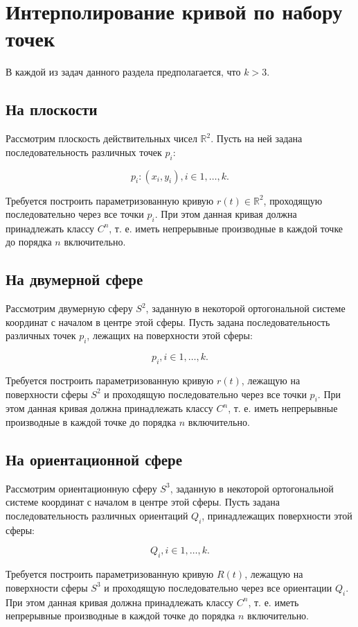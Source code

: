 \section{Интерполирование кривой по набору точек}

В каждой из задач данного раздела предполагается, что $k>3$.

\subsection*{На плоскости}

Рассмотрим плоскость действительных чисел $\mathbb{R}^2$. Пусть на ней задана последовательность различных точек $p_i$:

$${p_i: (x_i, y_i)}, i \in {1, \dots, k}.$$

Требуется построить параметризованную кривую $r(t) \in \mathbb{R}^2$, проходящую последовательно через все точки
$p_i$. При этом данная кривая должна принадлежать классу $C^n$, т. е. иметь непрерывные производные в каждой точке до
порядка $n$ включительно.

\subsection*{На двумерной сфере}

Рассмотрим двумерную сферу $S^2$, заданную в некоторой ортогональной системе координат с началом в центре этой сферы.
Пусть задана последовательность различных точек $p_i$, лежащих на поверхности этой сферы:

$${p_i}, i \in {1, \dots, k}.$$

Требуется построить параметризованную кривую $r(t)$, лежащую на поверхности сферы $S^2$ и проходящую последовательно
через все точки $p_i$. При этом данная кривая должна принадлежать классу $C^n$, т. е. иметь непрерывные производные в
каждой точке до порядка $n$ включительно.

\subsection*{На ориентационной сфере}

Рассмотрим ориентационную сферу $S^3$, заданную в некоторой ортогональной сис\-теме координат с началом в центре этой
сферы. Пусть задана последовательность различных ориентаций $Q_i$, принадлежащих поверхности этой сферы:

$${Q_i}, i \in {1, \dots, k}.$$

Требуется построить параметризованную кривую $R(t)$, лежащую на поверхности сферы $S^3$ и проходящую
последовательно через все ориентации $Q_i$. При этом данная кривая должна принадлежать классу $C^n$, т. е. иметь
непрерывные производные в каждой точке до порядка $n$ включительно.
